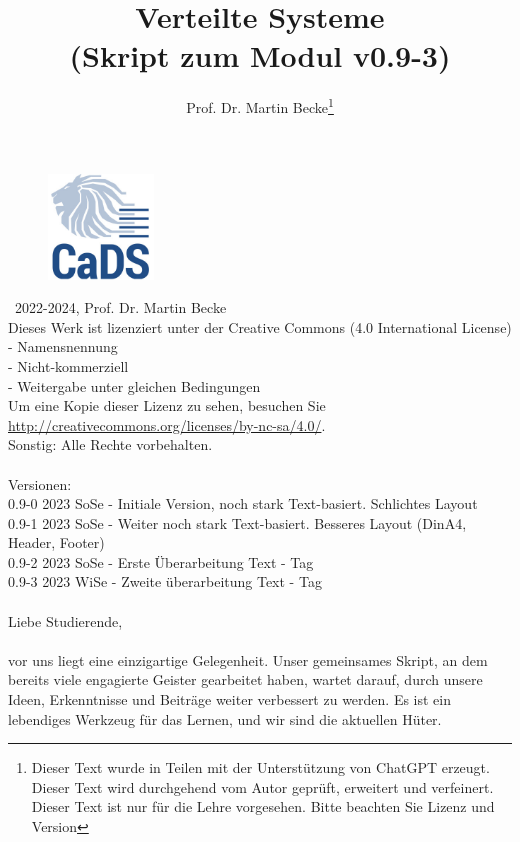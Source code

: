\documentclass[a4paper]{article}
\title{Verteilte Systeme\\ (Skript zum Modul v0.9-3)}
\author{Prof. Dr. Martin Becke\footnote{Dieser Text wurde in Teilen mit der Unterstützung von ChatGPT erzeugt. Dieser Text{} wird durchgehend vom Autor geprüft, erweitert und verfeinert. Dieser Text ist nur für die Lehre vorgesehen. Bitte beachten Sie Lizenz und Version}}
\begin{document}
\maketitle
\vspace*{\fill} %
\begin{figure}[h]
  \centering
  \includegraphics[width=0.25\textwidth]{fig/graphics/CADS_Logo_Quadrat_300x300_RGB_72dpi.jpg} %
\end{figure}
\vspace*{\fill}

\newpage
\noindent
\textcopyright\ 2022-2024, Prof. Dr. Martin Becke\\
Dieses Werk ist lizenziert unter der Creative Commons (4.0 International License)\\
- Namensnennung\\ - Nicht-kommerziell\\ - Weitergabe unter gleichen Bedingungen \\Um eine Kopie dieser Lizenz zu sehen, besuchen Sie\\ \url{http://creativecommons.org/licenses/by-nc-sa/4.0/}.\\
Sonstig: Alle Rechte vorbehalten.
\noindent
\\\\
Versionen:\\
0.9-0 2023 SoSe - Initiale Version, noch stark Text-basiert. Schlichtes Layout\\
0.9-1 2023 SoSe - Weiter noch stark Text-basiert. Besseres Layout (DinA4, Header, Footer)\\ 
0.9-2 2023 SoSe - Erste Überarbeitung Text - Tag
\\
0.9-3 2023 WiSe - Zweite überarbeitung Text - Tag
\\\\
Liebe Studierende,\\\\ vor uns liegt eine einzigartige Gelegenheit. Unser gemeinsames Skript, an dem bereits viele engagierte Geister gearbeitet haben, wartet darauf, durch unsere Ideen, Erkenntnisse und Beiträge weiter verbessert zu werden. Es ist ein lebendiges Werkzeug für das Lernen, und wir sind die aktuellen Hüter.
\end{document}
